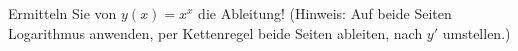 \item Ermitteln Sie von $y(x)=x^x$ die Ableitung! (Hinweis: Auf beide Seiten Logarithmus anwenden, per Kettenregel beide Seiten ableiten, nach $y'$ umstellen.)